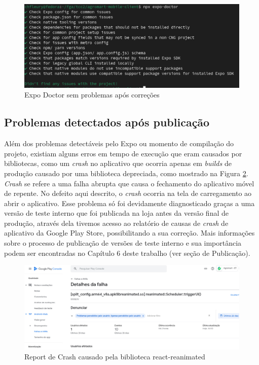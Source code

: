 \begin{figure}[h]
	\centering
	\includegraphics[keepaspectratio=true,scale=0.4]{figuras/doctor-success.jpeg}
	\caption{Expo Doctor sem problemas após correções}
	\label{doctor-success}
\end{figure}

\subsection{Problemas detectados após publicação}

Além dos problemas detectáveis pelo Expo ou momento de compilação do projeto, existiam alguns erros em tempo de execução que eram causados por bibliotecas, como um \textit{crash} no aplicativo que ocorria apenas em \textit{builds} de produção causado por uma biblioteca depreciada, como mostrado na Figura \ref{react-reanimated-crash}.
\textit{Crash} se refere a uma falha abrupta que causa o fechamento do aplicativo móvel de repente. No defeito aqui descrito, o \textit{crash} ocorria na tela de carregamento ao abrir o aplicativo. Esse problema só foi devidamente diagnosticado graças a uma versão de teste interno que foi publicada na loja antes da versão final de produção, através dela tivemos acesso ao relatório de causas de \textit{crash} de aplicativo da Google Play Store, possibilitando a sua correção.
Mais informações sobre o processo de publicação de versões de teste interno e sua importância podem ser encontradas no Capítulo 6 deste trabalho (ver seção de Publicação).

\begin{figure}[h]
	\centering
	\includegraphics[keepaspectratio=true,scale=0.4]{figuras/react-reanimated-crash.png}
	\caption{Report de Crash causado pela biblioteca react-reanimated}
	\label{react-reanimated-crash}
\end{figure}

